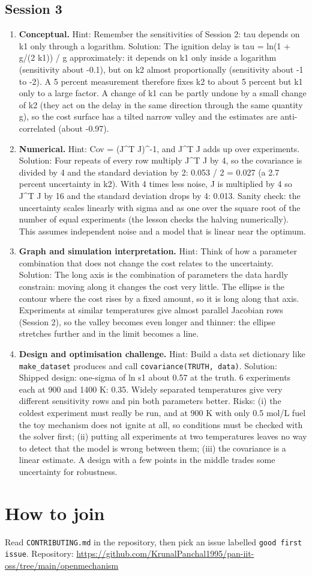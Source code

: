 \documentclass[11pt,a4paper]{article}
\begin{document}
\subsection*{Session 3}
\begin{enumerate}[nosep]
\item \textbf{Conceptual.} Hint: Remember the sensitivities of Session 2: tau depends on k1 only through a logarithm. Solution: The ignition delay is tau = ln(1 + g/(2 k1)) / g approximately: it depends on k1 only inside a logarithm (sensitivity about -0.1), but on k2 almost proportionally (sensitivity about -1 to -2). A 5 percent measurement therefore fixes k2 to about 5 percent but k1 only to a large factor. A change of k1 can be partly undone by a small change of k2 (they act on the delay in the same direction through the same quantity g), so the cost surface has a tilted narrow valley and the estimates are anti-correlated (about -0.97).
\item \textbf{Numerical.} Hint: Cov = (J\textasciicircum{}T J)\textasciicircum{}-1, and J\textasciicircum{}T J adds up over experiments. Solution: Four repeats of every row multiply J\textasciicircum{}T J by 4, so the covariance is divided by 4 and the standard deviation by 2: 0.053 / 2 = 0.027 (a 2.7 percent uncertainty in k2). With 4 times less noise, J is multiplied by 4 so J\textasciicircum{}T J by 16 and the standard deviation drops by 4: 0.013. Sanity check: the uncertainty scales linearly with sigma and as one over the square root of the number of equal experiments (the lesson checks the halving numerically). This assumes independent noise and a model that is linear near the optimum.
\item \textbf{Graph and simulation interpretation.} Hint: Think of how a parameter combination that does not change the cost relates to the uncertainty. Solution: The long axis is the combination of parameters the data hardly constrain: moving along it changes the cost very little. The ellipse is the contour where the cost rises by a fixed amount, so it is long along that axis. Experiments at similar temperatures give almost parallel Jacobian rows (Session 2), so the valley becomes even longer and thinner: the ellipse stretches further and in the limit becomes a line.
\item \textbf{Design and optimisation challenge.} Hint: Build a data set dictionary like \texttt{make\_dataset} produces and call \texttt{covariance(TRUTH, data)}. Solution: Shipped design: one-sigma of ln s1 about 0.57 at the truth. 6 experiments each at 900 and 1400 K: 0.35. Widely separated temperatures give very different sensitivity rows and pin both parameters better. Risks: (i) the coldest experiment must really be run, and at 900 K with only 0.5 mol/L fuel the toy mechanism does not ignite at all, so conditions must be checked with the solver first; (ii) putting all experiments at two temperatures leaves no way to detect that the model is wrong between them; (iii) the covariance is a linear estimate. A design with a few points in the middle trades some uncertainty for robustness.
\end{enumerate}

\section{How to join}
Read \texttt{CONTRIBUTING.md} in the repository, then pick an issue labelled \texttt{good first issue}. Repository: \url{https://github.com/KrunalPanchal1995/pan-iit-oss/tree/main/openmechanism}
\end{document}
